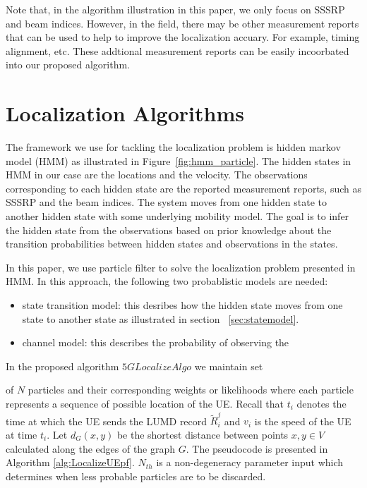 \documentclass[conference, 10pt]{IEEEtran}
\begin{document}
Note that, in the algorithm illustration in this paper, we only focus on SSSRP and beam indices. However, in the field, there may be other measurement reports that 
can be used to help to improve the localization accuary. For example, timing alignment, etc. These addtional measurement reports can be easily incoorbated into our proposed algorithm.

\section{Localization Algorithms}
\label{sec:localalgo}

The framework we use for tackling the localization problem is hidden markov model (HMM) as illustrated 
in Figure~\ref{fig:hmm_particle}. The hidden states in HMM in our case are the locations and the velocity. 
The observations corresponding to each hidden state are the reported measurement reports, such as SSSRP and the beam indices.
The system moves from one hidden state to another hidden state with some underlying mobility model. 
The goal is to infer the hidden state from the observations based on
prior knowledge about the transition probabilities between hidden states and
observations in the states.

In this paper, we use particle filter to solve the localization problem presented in HMM. In this approach, the following two probablistic models are needed:
\begin{itemize}
	\item state transition model: this desribes how the hidden state moves from one state to another state as illustrated in section ~\ref{sec:statemodel}.
	\item channel model: this describes the probability of observing the %
\end{itemize}
 In the proposed algorithm $5GLocalizeAlgo$ we maintain set

 of $N$ particles and their corresponding weights or likelihoods where each
 particle represents a sequence of possible location of the UE. Recall that $t_i$
 denotes the time at which the UE sends the LUMD record $\tilde{R}^j_i$ and $v_i$ is
 the speed of the UE at time $t_i.$ Let $d_G(x,y)$ be the shortest distance
 between points $x,y \in V$ calculated along the edges of the graph $G.$ The
 pseudocode is presented in Algorithm \ref{alg:LocalizeUEpf}. $N_{th}$ is a
 non-degeneracy parameter input which determines when less probable particles are
 to be discarded. 
\end{document}
